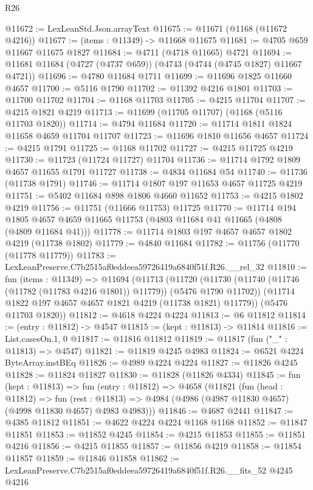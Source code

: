 \begin{lexlean}{R26}
\begin{coremodule}
@11672 := LexLeanStd.Json.arrayText
@11675 := @11671 (@1168 (@11672 @4216))
@11677 := (items : @11349) -> @11668 @11675
@11681 := @4705 @659 @11667 @11675 @1827
@11684 := @4711 (@4718 @11665) @4721
@11694 := @11681 @11684 (@4727 (@4737 @659)) (@4743 (@4744 (@4745 @1827) @11667 @4721))
@11696 := @4780 @11684 @1711
@11699 := @11696 @1825 @11660 @4657
@11700 := @5116 @1790
@11702 := @11392 @4216 @1801
@11703 := @11700 @11702
@11704 := @1168 @11703
@11705 := @4215 @11704
@11707 := @4215 @1821 @4219
@11713 := @11699 (@11705 @11707) (@1168 (@5116 @11703 @1820))
@11714 := @4794 @11684
@11720 := @11714 @1811 @1824 @11658 @4659 @11704 @11707
@11723 := @11696 @1810 @11656 @4657
@11724 := @4215 @1791
@11725 := @1168 @11702
@11727 := @4215 @11725 @4219
@11730 := @11723 (@11724 @11727) @11704
@11736 := @11714 @1792 @1809 @4657 @11655 @1791 @11727
@11738 := @4834 @11684 @54
@11740 := @11736 (@11738 @1791)
@11746 := @11714 @1807 @197 @11653 @4657 @11725 @4219
@11751 := @5402 @11684 @898 @1806 @4660 @11652
@11753 := @4215 @1802 @4219
@11756 := @11751 (@11666 @11753) @11725
@11770 := @11714
    @194
    @1805
    @4657
    @4659
    @11665
    @11753
    (@4803 @11684 @41 @11665 (@4808 (@4809 @11684 @41)))
@11778 := @11714 @1803 @197 @4657 @4657 @1802 @4219 (@11738 @1802)
@11779 := @4840 @11684
@11782 := @11756 (@11770 (@11778 @11779))
@11783 := LexLeanPreserve.C7b2515af0eddeea59726419a6840f51f.R26.__rel_32
@11810 := fun (items : @11349) =>
  @11694
    (@11713
      (@11720
        (@11730 (@11740 (@11746 (@11782 (@11783 @4216 @1801)) @11779)) (@5476 @1790 @11702))
        (@11714 @1822 @197 @4657 @4657 @1821 @4219 (@11738 @1821) @11779))
      (@5476 @11703 @1820))
@11812 := @4618 @4224 @4224
@11813 := @6 @11812
@11814 := (entry : @11812) -> @4547
@11815 := (kept : @11813) -> @11814
@11816 := List.casesOn.{1, 0}
@11817 := @11816 @11812
@11819 := @11817 (fun ("_" : @11813) => @4547)
@11821 := @11819 @4245 @4983
@11824 := @6521 @4224 ByteArray.instBEq
@11826 := @4989 @4224 @4224
@11827 := @11826 @4245
@11828 := @11824 @11827
@11830 := @11828 (@11826 @4334)
@11845 := fun (kept : @11813) =>
  fun (entry : @11812) =>
  @4658
    (@11821
      (fun (head : @11812) =>
      fun (rest : @11813) => @4984 (@4986 (@4987 @11830 @4657) (@4998 @11830 @4657) @4983 @4983)))
@11846 := @4687 @2441
@11847 := @4385 @11812
@11851 := @4622 @4224 @4224 @1168 @1168
@11852 := @11847 @11851
@11853 := @11852 @4245
@11854 := @4215 @11853
@11855 := @11851 @4216
@11856 := @4215 @11855
@11857 := @11856 @4219
@11858 := @11854 @11857
@11859 := @11846 @11858
@11862 := LexLeanPreserve.C7b2515af0eddeea59726419a6840f51f.R26.__fits_52 @4245 @4216

\end{coremodule}
\end{lexlean}
